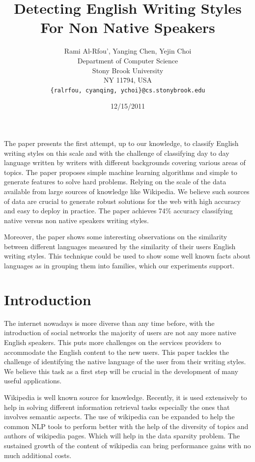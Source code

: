 \documentclass[11pt]{article}
\title{Detecting English Writing Styles For Non Native Speakers}
\author{Rami Al-Rfou', Yanging Chen, Yejin Choi \\
  Department of Computer Science \\
  Stony Brook University \\
  NY 11794, USA \\
  {\tt \{ralrfou, cyanqing, ychoi\}@cs.stonybrook.edu}}
\date{12/15/2011}
\begin{document}
\maketitle
\begin{abstract}
\end{abstract}


The paper presents the first attempt, up to our knowledge, to classify English writing styles on this scale and with the challenge of classifying day to day language written by writers with different backgrounds covering various areas of topics. The paper proposes simple machine learning algorithms and simple to generate features to solve hard problems. Relying on the scale of the data available from large sources of knowledge like Wikipedia. We believe such sources of data are crucial to generate robust solutions for the web with high accuracy and easy to deploy in practice. The paper achieves 74\% accuracy classifying native versus non native speakers writing styles.

Moreover, the paper shows some interesting observations on the similarity between different languages measured by the similarity of their users English writing styles. This technique could be used to show some well known facts about languages as in grouping them into families, which our experiments support.

\section{Introduction}
The internet nowadays is more diverse than any time before, with the introduction of social networks the majority of users are not any more native English speakers. This puts more challenges on the services providers to accommodate the English content to the new users. This paper tackles the challenge of identifying the native language of the user from their writing styles. We believe this task as a first step will be crucial in the development of many useful applications.

Wikipedia is well known source for knowledge. Recently, it is used extensively to help in solving different information retrieval tasks especially the ones that involves semantic aspects. The use of wikipedia can be expanded to help the common NLP tools to perform better with the help of the diversity of topics and authors of wikipedia pages. Which will help in the data sparsity problem. The sustained growth of the content of wikipedia can bring performance gains with no much additional costs.
\end{document}
